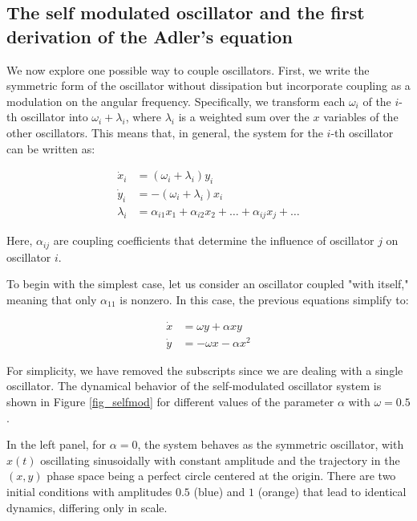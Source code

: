 \documentclass{article}
\begin{document}
\subsection{The self modulated oscillator and the first derivation of the Adler's equation}

We now explore one possible way to couple oscillators. 
First, we write the symmetric form of the oscillator without dissipation but incorporate coupling as a modulation on the angular frequency. 
Specifically, we transform each $\omega_i$ of the $i$-th oscillator into $\omega_i + \lambda_i$, where $\lambda_i$ is a weighted sum over the $x$ variables of the other oscillators. 
This means that, in general, the system for the $i$-th oscillator can be written as:

\begin{subequations} \label{eq_coupled_oscillators}
\begin{align}
    \dot{x}_i & = (\omega_i + \lambda_i) y_i \\
    \dot{y}_i & = -(\omega_i + \lambda_i) x_i \\
    \lambda_i & = \alpha_{i1} x_1 + \alpha_{i2} x_2 + \dots + \alpha_{ij} x_j + \dots
\end{align}
\end{subequations}

Here, $\alpha_{ij}$ are coupling coefficients that determine the influence of oscillator $j$ on oscillator $i$.

To begin with the simplest case, let us consider an oscillator coupled "with itself," meaning that only $\alpha_{11}$ is nonzero. In this case, the previous equations simplify to:

\begin{subequations} \label{eq_self_coupled_oscillator}
\begin{align}
    \dot{x} & = \omega y + \alpha xy \\
    \dot{y} & = -\omega x - \alpha x^2
\end{align}
\end{subequations}

For simplicity, we have removed the subscripts since we are dealing with a single oscillator.
The dynamical behavior of the self-modulated oscillator system is shown in Figure \ref{fig_selfmod} for different values of the parameter $\alpha$ with $\omega = 0.5$. 

In the left panel, for $\alpha = 0$, the system behaves as the symmetric oscillator, with $x(t)$ oscillating sinusoidally with constant amplitude and the trajectory in the $(x, y)$ phase space being a perfect circle centered at the origin. 
There are two initial conditions with amplitudes $0.5$ (blue) and $1$ (orange) that lead to identical dynamics, differing only in scale.
\end{document}
